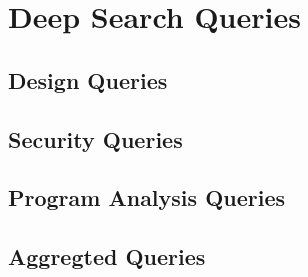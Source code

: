 \chapter{Deep Search Queries}
\label{findings_chapter}
\section{Design Queries}

\section{Security Queries}

\section{Program Analysis Queries}

\section{Aggregted Queries}

